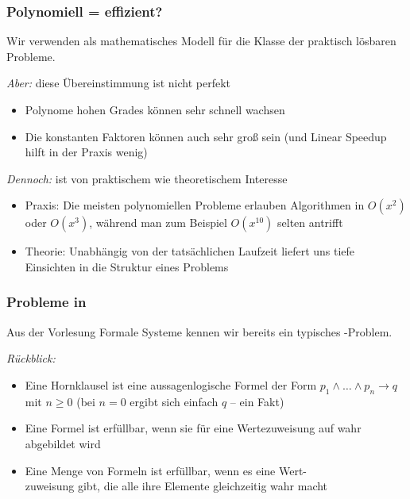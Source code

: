\documentclass[aspectratio=1610,onlymath]{beamer}
\begin{document}
\begin{frame}\frametitle{Polynomiell = effizient?}

Wir verwenden  als mathematisches Modell für die Klasse
der praktisch lösbaren Probleme.
\bigskip

\emph{Aber:} diese Übereinstimmung ist nicht perfekt
\begin{itemize}
\item Polynome hohen Grades können sehr schnell wachsen
\item Die konstanten Faktoren können auch sehr groß sein (und Linear Speedup hilft in der Praxis wenig)
\end{itemize}\bigskip\pause

\emph{Dennoch:}  ist von praktischem wie theoretischem Interesse
\begin{itemize}
\item \alert{Praxis:} Die meisten polynomiellen Probleme erlauben Algorithmen in $O(x^2)$ oder $O(x^3)$, während man zum Beispiel $O(x^{10})$ selten antrifft
\item \alert{Theorie:} Unabhängig von der tatsächlichen Laufzeit liefert uns  tiefe Einsichten in die Struktur eines Problems
\end{itemize}

\end{frame}

\begin{frame}\frametitle{Probleme in }

Aus der Vorlesung Formale Systeme kennen wir bereits ein
typisches -Problem.\bigskip

\emph{Rückblick:}
\begin{itemize}
\item Eine \alert{Hornklausel} ist eine aussagenlogische Formel der Form $p_1\wedge\ldots\wedge p_n\to q$ mit $n\geq 0$
{\tiny (bei $n=0$ ergibt sich einfach $q$ -- ein \alert{Fakt})}
\item Eine Formel ist \alert{erfüllbar}, wenn sie für eine Wertezuweisung auf wahr abgebildet wird
\item Eine Menge von Formeln ist erfüllbar, wenn es eine Wert-\\zuweisung gibt, die alle
ihre Elemente gleichzeitig wahr macht
\end{itemize}\bigskip


\end{frame}
\end{document}
